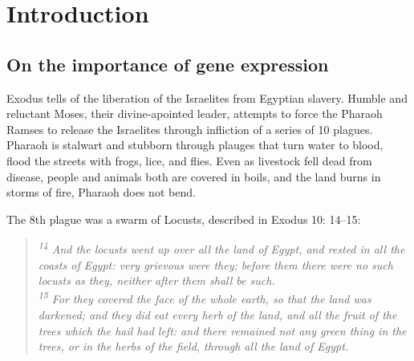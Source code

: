 \chapter{Introduction} %
\label{Chapter1} %

\label{geneNames}
\newcommand\slo{\textit{slo1}}
\newcommand\fn{\textit{Fn1}}
\newcommand\kcnma{\textit{Kcnma}}
\newcommand\dscam{\textit{Dscam1}}

\section{On the importance of gene expression}\label{sec:Importatance of Gene Expression} 

Exodus tells of the liberation of the Israelites from Egyptian slavery. Humble and reluctant Moses, their divine-apointed leader, attempts to force the Pharaoh Ramses to release the Israelites through infliction of a series of 10 plagues. Pharaoh is stalwart and stubborn through plauges that turn water to blood, flood the streets with frogs, lice, and flies. Even as livestock fell dead from disease, people and animals both are covered in boils, and the land burns in storms of fire, Pharaoh does not bend.

The 8th plague was a swarm of Locusts, described in Exodus 10: 14–15:

\begin{quote}
	\itshape %
	\singlespacing
	\textsuperscript{14} And the locusts went up over all the land of Egypt, and rested in all the coasts of Egypt: very grievous were they; before them there were no such locusts as they, neither after them shall be such.\\
	\textsuperscript{15} For they covered the face of the whole earth, so that the land was darkened; and they did eat every herb of the land, and all the fruit of the trees which the hail had left: and there remained not any green thing in the trees, or in the herbs of the field, through all the land of Egypt.
\end{quote}

